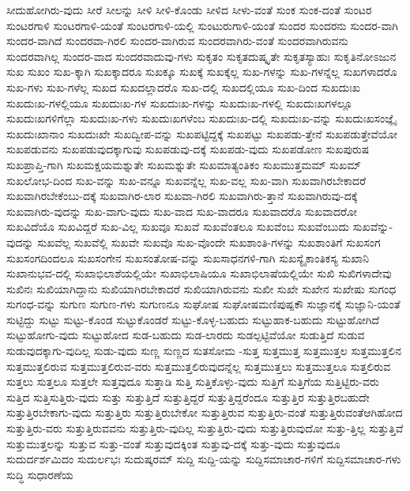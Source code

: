 {ಸೀದುಹೋಗಿರು-ವುದು
ಸೀರೆ
ಸೀಲನ್ನು
ಸೀಳಿ
ಸೀಳಿ-ಕೊಂಡು
ಸೀಳಿದ
ಸೀಳು-ವಂತೆ
ಸುಂಕ
ಸುಂಕ-ದಂತೆ
ಸುಂಟರ
ಸುಂಟರಗಾಳಿ
ಸುಂಟರಗಾಳಿ-ಯಂತೆ
ಸುಂಟರಗಾಳಿ-ಯಲ್ಲಿ
ಸುಂಟುರುಗಾಳಿ-ಯಂತೆ
ಸುಂದರ
ಸುಂದರನು
ಸುಂದರ-ವಾಗಿ
ಸುಂದರ-ವಾಗಿದೆ
ಸುಂದರವಾ-ಗಿರಲಿ
ಸುಂದರ-ವಾಗಿರುವ
ಸುಂದರವಾಗಿರು-ವಂತೆ
ಸುಂದರವಾಗಿರುವನು
ಸುಂದರವಾಗಿಲ್ಲ
ಸುಂದರ-ವಾದ
ಸುಂದರವಾದುವು-ಗಳು
ಸುಕೃತಂ
ಸುಕೃತದುಷ್ಕೃತೇ
ಸುಕೃತಸ್ಯಾಹುಃ
ಸುಕೃತಿನೋಽಜುನ
ಸುಖ
ಸುಖಂ
ಸುಖ-ಕ್ಕಾಗಿ
ಸುಖಕ್ಕಾದರೂ
ಸುಖಕ್ಕೂ
ಸುಖಕ್ಕೆ
ಸುಖಕ್ಕೆಲ್ಲ
ಸುಖ-ಗಳನ್ನು
ಸುಖ-ಗಳನ್ನೆಲ್ಲ
ಸುಖಗಳಾದರೊ
ಸುಖ-ಗಳು
ಸುಖ-ಗಳೆಲ್ಲ
ಸುಖದ
ಸುಖದಲ್ಲಾದರೊ
ಸುಖ-ದಲ್ಲಿ
ಸುಖದಲ್ಲಿಯೂ
ಸುಖ-ದಿಂದ
ಸುಖದುಃಖ
ಸುಖದುಃಖ-ಗಳಲ್ಲಿಯೂ
ಸುಖದುಃಖ-ಗಳ
ಸುಖದುಃಖ-ಗಳನ್ನು
ಸುಖದುಃಖ-ಗಳಲ್ಲಿ
ಸುಖದುಃಖಗಳಲ್ಲೂ
ಸುಖದುಃಖಗಳಿಗೆಲ್ಲಾ
ಸುಖದುಃಖ-ಗಳು
ಸುಖದುಃಖಗಳೆಂಬ
ಸುಖದುಃಖ-ದಲ್ಲಿ
ಸುಖದುಃಖ-ವನ್ನು
ಸುಖದುಃಖಸಂಜ್ಞೈ
ಸುಖದುಃಖಾನಾಂ
ಸುಖದುಃಖೇ
ಸುಖದ್ವೀಪ-ವನ್ನು
ಸುಖಪಟ್ಟಿದ್ದಕ್ಕೆ
ಸುಖಪಟ್ಟು
ಸುಖಪಡು-ತ್ತೇನೆ
ಸುಖಪಡುತ್ತೇವೆಯೋ
ಸುಖಪಡುವನು
ಸುಖಪಡುವುದಕ್ಕಾಗುವು
ಸುಖಪಡುವು-ದಕ್ಕೆ
ಸುಖಪಡು-ವುದು
ಸುಖಪಡೋಣ
ಸುಖಪುರುಷ
ಸುಖಪ್ರಾಪ್ತಿ-ಗಾಗಿ
ಸುಖಮಕ್ಷಯಮಶ್ನುತೇ
ಸುಖಮಶ್ನುತೇ
ಸುಖಮಾತ್ಯಂತಿಕಂ
ಸುಖಮುತ್ತಮಮ್
ಸುಖಮ್
ಸುಖಲೋಭ-ದಿಂದ
ಸುಖ-ವನ್ನು
ಸುಖ-ವನ್ನೂ
ಸುಖವನ್ನೆಲ್ಲ
ಸುಖ-ವಲ್ಲ
ಸುಖ-ವಾಗಿ
ಸುಖವಾಗಿರಬೇಕಾದರೆ
ಸುಖವಾಗಿರಬೇಕೆಂಬು-ದಕ್ಕೆ
ಸುಖವಾಗಿರ-ಲಾರ
ಸುಖವಾ-ಗಿರಲಿ
ಸುಖವಾಗಿರು-ತ್ತಾನೆ
ಸುಖವಾಗಿರುವು-ದಕ್ಕೆ
ಸುಖವಾಗಿರು-ವುದನ್ನು
ಸುಖ-ವಾಗು-ವುದು
ಸುಖ-ವಾದ
ಸುಖ-ವಾದರೂ
ಸುಖವಾದರೊ
ಸುಖವಾದರೋ
ಸುಖವಿದೆಯೊ
ಸುಖವಿದ್ದರೆ
ಸುಖ-ವಿಲ್ಲ
ಸುಖವೂ
ಸುಖವೆ
ಸುಖವೆಂತಲೂ
ಸುಖವೆಂಬ
ಸುಖವೆಂಬುದು
ಸುಖವೆನ್ನು-ವುದನ್ನು
ಸುಖವೆಲ್ಲ
ಸುಖವೆಲ್ಲಿ
ಸುಖವೇ
ಸುಖವೊ
ಸುಖ-ವೊಂದೇ
ಸುಖಶಾಂತಿ-ಗಳನ್ನು
ಸುಖಶಾಂತಿಗೆ
ಸುಖಸಂಗ
ಸುಖಸಂಗದಿಂದಲೂ
ಸುಖಸಂಗೇನ
ಸುಖಸಂತೋಷ-ವನ್ನು
ಸುಖಸಾಧನಗಳಿ-ಗಾಗಿ
ಸುಖಸ್ಯೈಕಾಂತಿಕಸ್ಯ
ಸುಖಾನಿ
ಸುಖಾನುಭವ-ದಲ್ಲಿ
ಸುಖಾಭಿಲಾಶೆಯಲ್ಲಿಯೇ
ಸುಖಾಭಿಲಾಷಿಯೂ
ಸುಖಾಭಿಲಾಷೆಯಲ್ಲಿಯೇ
ಸುಖಿ
ಸುಖಿಗಳಾದೇವು
ಸುಖಿನಃ
ಸುಖಿಯಾಗಿದ್ದಾನು
ಸುಖಿಯಾಗಿರಬೇಕಾದರೆ
ಸುಖಿಯಾಗಿರುವನು
ಸುಖೀ
ಸುಖೇ
ಸುಖೇನ
ಸುಖೇಷು
ಸುಗಂಧ
ಸುಗಂಧ-ವನ್ನು
ಸುಗುಣ
ಸುಗುಣ-ಗಳು
ಸುಗುಣನೂ
ಸುಘೋಷ
ಸುಘೋಷಮಣಿಪುಷ್ಪಕೌ
ಸುಜ್ಞಾನಕ್ಕೆ
ಸುಜ್ಞಾನಿ-ಯಂತೆ
ಸುಟ್ಟಿದ್ದು
ಸುಟ್ಟು
ಸುಟ್ಟು-ಕೊಂಡ
ಸುಟ್ಟುಕೊಂಡರೆ
ಸುಟ್ಟು-ಕೊಳ್ಳ-ಬಹುದು
ಸುಟ್ಟುಹಾಕ-ಬಹುದು
ಸುಟ್ಟುಹೋಗಿದೆ
ಸುಟ್ಟುಹೋಗು-ವುದು
ಸುಟ್ಟುಹೋದ
ಸುಡ-ಬಹುದು
ಸುಡ-ಲಾರದು
ಸುಡಲ್ಪಟ್ಟಿವೆಯೋ
ಸುಡುತ್ತಿದೆ
ಸುಡುವ
ಸುಡುವುದಕ್ಕಾಗು-ವುದಿಲ್ಲ
ಸುಡು-ವುದು
ಸುಣ್ಣ
ಸುಣ್ಣದ
ಸುತಸೋಮ
-ಸುತ್ತ
ಸುತ್ತಮುತ್ತ
ಸುತ್ತಮುತ್ತಲ
ಸುತ್ತಮುತ್ತಲಿನ
ಸುತ್ತಮುತ್ತಲಿರುವ
ಸುತ್ತಮುತ್ತಲಿರುವ-ವರು
ಸುತ್ತಮುತ್ತಲಿರುವುದನ್ನೆಲ್ಲ
ಸುತ್ತಮುತ್ತಲು
ಸುತ್ತಮುತ್ತಲೂ
ಸುತ್ತಲಿರುವ
ಸುತ್ತಲು
ಸುತ್ತಲೂ
ಸುತ್ತಲೇ
ಸುತ್ತವುದೂ
ಸುತ್ತಾಡಿ
ಸುತ್ತಿ
ಸುತ್ತಿಕೊಳ್ಳು-ವುದು
ಸುತ್ತಿಗೆ
ಸುತ್ತಿಗೆಯ
ಸುತ್ತಿಟ್ಟಿರು-ವರು
ಸುತ್ತಿದ
ಸುತ್ತಿಸುತ್ತಿರು-ವುದು
ಸುತ್ತು
ಸುತ್ತುತ್ತಿದೆ
ಸುತ್ತುತ್ತಿದ್ದರೆ
ಸುತ್ತುತ್ತಿದ್ದರೆಂದೂ
ಸುತ್ತುತ್ತಿರ
ಸುತ್ತುತ್ತಿರಬಹುದೇ
ಸುತ್ತುತ್ತಿರಬೇಕಾಗು-ವುದು
ಸುತ್ತುತ್ತಿರು
ಸುತ್ತುತ್ತಿರುಬೇಕೋ
ಸುತ್ತುತ್ತಿರುವ
ಸುತ್ತುತ್ತಿರು-ವಂತೆ
ಸುತ್ತುತ್ತಿರುವಂತೆಆಗಿಹೋದ
ಸುತ್ತುತ್ತಿರು-ವರು
ಸುತ್ತುತ್ತಿರುವವನು
ಸುತ್ತುತ್ತಿರು-ವುದಿಲ್ಲ
ಸುತ್ತುತ್ತಿರು-ವುದು
ಸುತ್ತುತ್ತಿರುವುದೋ
ಸುತ್ತು-ತ್ತಿಲ್ಲ
ಸುತ್ತುತ್ತಿವೆ
ಸುತ್ತುಮುತ್ತಲನ್ನು
ಸುತ್ತುವ
ಸುತ್ತು-ವಂತೆ
ಸುತ್ತುವುದಕ್ಕಿಂತ
ಸುತ್ತುವು-ದಕ್ಕೆ
ಸುತ್ತು-ವುದು
ಸುತ್ತುವುದೂ
ಸುದುರ್ದರ್ಶಮಿದಂ
ಸುದುರ್ಲಭಃ
ಸುದುಷ್ಕರಮ್
ಸುದ್ದಿ
ಸುದ್ದಿ-ಯನ್ನು
ಸುದ್ದಿಸಮಾಚಾರ-ಗಳಿಗೆ
ಸುದ್ದಿಸಮಾಚಾರ-ಗಳು
ಸುದ್ಧಿ
ಸುಧಾರಣೆಯ
}
